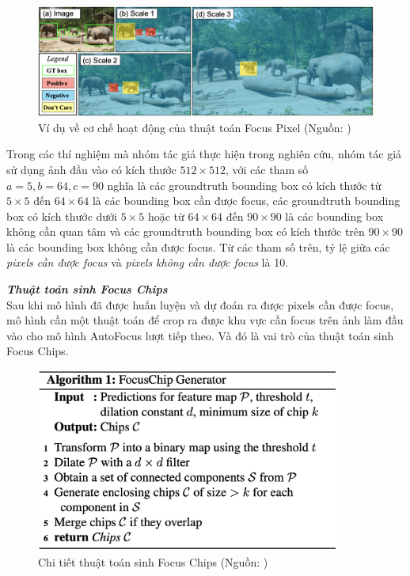 {    \begin{figure}[H]
        \centering
        \includegraphics[width=15cm] {images/autofocus_focus_pixel}
        \caption{Ví dụ về cơ chế hoạt động của thuật toán Focus Pixel  (Nguồn: \cite{najibi2019autofocus})}
        \label{fig:autofocus_focus_pixel}
    \end{figure}

    \noindent
    Trong các thí nghiệm mà nhóm tác giả thực hiện trong nghiên cứu, nhóm tác giả sử dụng ảnh đầu vào có kích thước $512 \times 512$, với các tham số $a = 5, b = 64, c = 90$ nghĩa là các groundtruth  bounding box  có kích thước từ $5 \times 5$ đến $64 \times 64$ là các bounding box  cần được focus, các groundtruth  bounding box  có kích thước dưới $5 \times 5$ hoặc từ $64 \times 64$ đến $90 \times 90$ là các bounding box  không cần quan tâm và các groundtruth  bounding box  có kích thước trên $90 \times 90$ là các bounding box  không cần được focus.
    Từ các tham số trên, tỷ lệ giữa các \textit{pixels  cần được focus} và \textit{pixels  không cần được focus} là 10.

    \noindent
    \textbf{\textit{Thuật toán sinh Focus Chips}} \\
    Sau khi mô hình đã được huấn luyện và dự đoán ra được pixels  cần được focus, mô hình cần một thuật toán để crop ra được khu vực cần focus trên ảnh làm đầu vào cho mô hình AutoFocus  lượt tiếp theo.
    Và đó là vai trò của thuật toán sinh Focus Chips.

    \begin{figure}[H]
        \centering
        \includegraphics[width=10cm] {images/autofocus_focus_chip_gen}
        \caption{Chi tiết thuật toán sinh Focus Chips (Nguồn: \cite{najibi2019autofocus})}
        \label{fig:autofocus_focus_chip_gen}
    \end{figure}

}

